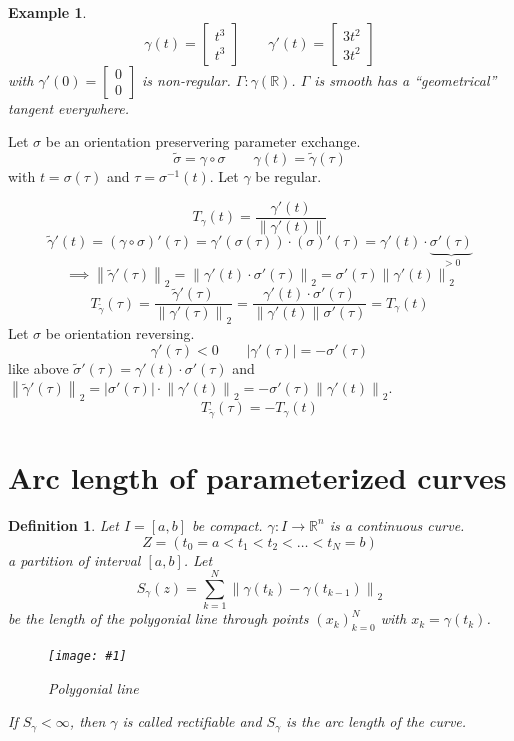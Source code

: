 \documentclass{article}
\newtheorem{example}{Example}  \numberwithin{example}{section}
\newtheorem{definition}{Definition}  \numberwithin{definition}{section}
\newcommand{\pic}[2]{%
 \begin{figure}[t]
  \begin{center}
   \texttt{[image: \#1]}
   \caption{#2}
  \end{center}
 \end{figure}
}
\newcommand{\norm}[1]{\left\|#1\right\|}
\newcommand{\card}[1]{\left|#1\right|}
\begin{document}
\begin{example}
  \[ \gamma(t) = \begin{bmatrix} t^3 \\ t^3 \end{bmatrix} \qquad \gamma'(t) = \begin{bmatrix} 3t^2 \\ 3t^2 \end{bmatrix} \]
  with $\gamma'(0) = \begin{bmatrix} 0 \\ 0 \end{bmatrix}$ is non-regular. $\Gamma: \gamma(\mathbb R)$. %
  $\Gamma$ is smooth has a \enquote{geometrical} tangent everywhere.
\end{example}

Let $\sigma$ be an orientation preservering parameter exchange.
\[ \tilde\sigma = \gamma \circ \sigma \qquad \gamma(t) = \tilde\gamma(\tau) \]
with $t = \sigma(\tau)$ and $\tau = \sigma^{-1}(t)$. Let $\gamma$ be regular.

\[ T_{\gamma}(t) = \frac{\gamma'(t)}{\norm{\gamma'(t)}} \]
\[ \tilde\gamma'(t) = (\gamma \circ \sigma)'(\tau) = \gamma'(\sigma(\tau)) \cdot (\sigma)'(\tau) = \gamma'(t) \cdot \underbrace{\sigma'(\tau)}_{> 0} \]
\[ \implies \norm{\tilde\gamma'(\tau)}_2 = \norm{\gamma'(t) \cdot \sigma'(\tau)}_2 = \sigma'(\tau) \norm{\gamma'(t)}_2 \]
\[ T_{\tilde\gamma}(\tau) = \frac{\tilde\gamma'(\tau)}{\norm{\gamma'(\tau)}_2} = \frac{\gamma'(t) \cdot \sigma'(\tau)}{\norm{\gamma'(t)} \sigma'(\tau)} = T_{\gamma}(t) \]
Let $\sigma$ be orientation reversing.
\[ \gamma'(\tau) < 0 \qquad \card{\gamma'(\tau)} = -\sigma'(\tau) \]
like above $\tilde\sigma'(\tau) = \gamma'(t) \cdot \sigma'(\tau)$ and $\norm{\tilde\gamma'(\tau)}_2 = \card{\sigma'(\tau)} \cdot \norm{\gamma'(t)}_2 = -\sigma'(\tau) \norm{\gamma'(t)}_2$.
\[ T_{\tilde\gamma}(\tau) = -T_{\gamma}(t) \]


\section{Arc length of parameterized curves}
\begin{definition} %
  Let $I = [a,b]$ be compact. $\gamma: I \to \mathbb R^n$ is a continuous curve.
  \[ Z = (t_0 = a < t_1 < t_2 < \dots < t_N = b) \]
  a partition of interval $[a,b]$. Let 
  \[ S_\gamma(z) = \sum_{k=1}^N \norm{\gamma(t_k) - \gamma(t_{k-1})}_2 \]
  be the length of the polygonial line through points $(x_k)_{k=0}^N$ with $x_k = \gamma(t_k)$.

  \pic{img/46_polygonial_line.pdf}{Polygonial line}

  If $S_{\gamma} < \infty$, then $\gamma$ is called \emph{rectifiable}
  and $S_{\gamma}$ is the \emph{arc length of the curve}.
\end{definition}
\end{document}
